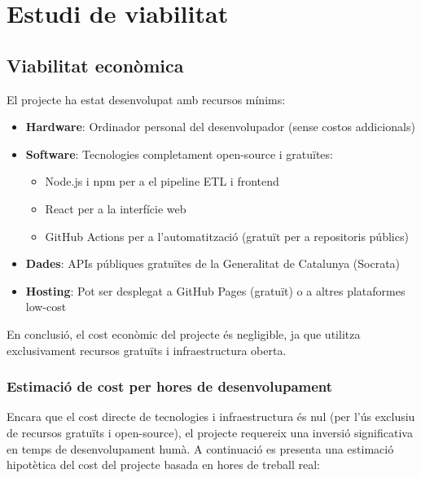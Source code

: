 

\chapter{Estudi de viabilitat}
\label{Ch:Viability}


\section{Viabilitat econòmica}

El projecte ha estat desenvolupat amb recursos mínims:

\begin{itemize}
    \item \textbf{Hardware}: Ordinador personal del desenvolupador (sense costos addicionals)
    \item \textbf{Software}: Tecnologies completament open-source i gratuïtes:
    \begin{itemize}
        \item Node.js i npm per a el pipeline ETL i frontend
        \item React per a la interfície web
        \item GitHub Actions per a l'automatització (gratuït per a repositoris públics)
    \end{itemize}
    \item \textbf{Dades}: APIs públiques gratuïtes de la Generalitat de Catalunya (Socrata)
    \item \textbf{Hosting}: Pot ser desplegat a GitHub Pages (gratuït) o a altres plataformes low-cost
\end{itemize}

En conclusió, el cost econòmic del projecte és negligible, ja que utilitza exclusivament recursos gratuïts i infraestructura oberta.

\subsection{Estimació de cost per hores de desenvolupament}

Encara que el cost directe de tecnologies i infraestructura és nul (per l'ús exclusiu de recursos gratuïts i open-source), el projecte requereix una inversió significativa en temps de desenvolupament humà. A continuació es presenta una estimació hipotètica del cost del projecte basada en hores de treball real:

